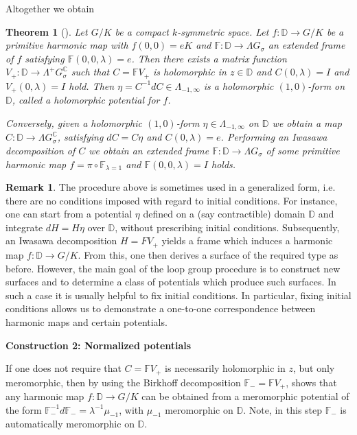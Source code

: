 \documentclass[a4paper,11pt]{amsart}
\newtheorem{theorem}{Theorem}[section]
\theoremstyle{definition}
\newtheorem{remark}{Remark}
\numberwithin{equation}{section}
\newcommand{\D}{\mathbb{D}}
\newcommand{\F}{\mathbb{F}}
\begin{document}
Altogether we obtain

\begin{theorem}[\cite{DPW}]\label{Th:DPW-hol}
 Let $G/K$ be a compact $k$-symmetric space.
Let $f: \D\rightarrow G/K$ be a primitive harmonic map with $f(0,0)=eK$ and 
$\F: \D \rightarrow \Lambda G_{\sigma}$  an extended frame of $f$ satisfying $\F(0, 0,\lambda) = e$. 
Then there exists a matrix function 
$V_+: \D \rightarrow  \Lambda^{+}G_{\sigma}^{\mathbb{C}}$ such that 
$C = \F V_+$ is holomorphic in $z \in \D$  and $C(0,\lambda) = I$ and $V_+(0,\lambda) = I$ hold.
Then $\eta = C^{-1} dC \in \Lambda_{-1,\infty}$ is a holomorphic $(1,0)$-form on $\D$, called a \emph{holomorphic potential} for $f$.

 Conversely, given a  holomorphic $(1,0)$-form $\eta \in \Lambda_{-1,\infty}$ on $\D$ 
we obtain a map  $C:\D \rightarrow \Lambda G_{\sigma}^{\mathbb C}$, 
satisfying $dC = C \eta$ and $C(0,\lambda)=e$.
Performing an Iwasawa decomposition of $C$ we obtain an extended frame $\F: \D \rightarrow \Lambda G_{\sigma}$ of some  primitive harmonic map $f=\pi\circ \F_{\lambda=1}$ and  $\F(0, 0, \lambda) = I$ holds. 
\end{theorem}

 \begin{remark}  \label{general DPW}
 The procedure above is sometimes used in a generalized form, i.e. there are no conditions imposed with regard to initial conditions.  For instance, one can start from a potential $\eta$ defined on a (say contractible) domain $\D$ and integrate $dH = H \eta$ over $\D$, without prescribing initial conditions. 
 Subsequently, an Iwasawa decomposition $H = F V_+$ yields a frame  which induces a harmonic map 
 $f: \D \rightarrow G/K$. From this, one then derives a surface of the required type as before. However, the main goal of the loop group procedure is to construct new surfaces and to determine a class of potentials which produce such surfaces.
 In such a case it is usually helpful to fix initial conditions. In particular, fixing initial conditions allows  us to demonstrate a one-to-one correspondence between harmonic maps and certain potentials. 
 \end{remark}
 

{\bf Construction 2: Normalized potentials}
\vspace{2mm}

If one does not require that $C = \F V_+$ is necessarily holomorphic in $z$, but only meromorphic,  then by using the  Birkhoff decomposition  
$\F_- = \F V_+$, \cite{DPW} shows that any  harmonic map 
$f: \D\rightarrow G/K$ can  be obtained from a meromorphic potential of the form 
$ \F_-^{-1} d\F_- =\lambda^{-1}\mu_{-1}$, with $\mu_{-1}$ meromorphic on $\D$.
Note, in this step $\F_-$ is automatically meromorphic on $\D$.
\end{document}
